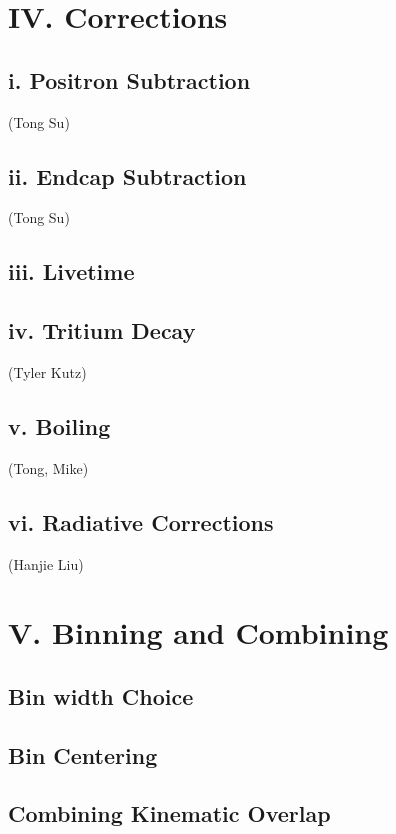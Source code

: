 \documentclass[letterpaper,aps,prl,superscriptaddress,floatfix,twocolumn]{revtex4}
\begin{document}
\section{IV. Corrections}

 \subsection{i. Positron Subtraction}
 (Tong Su)

 \subsection{ii. Endcap Subtraction}
 (Tong Su)

 \subsection{iii. Livetime}

 \subsection{iv. Tritium Decay}
 (Tyler Kutz)

 \subsection{v. Boiling}
 (Tong, Mike)

 \subsection{vi. Radiative Corrections}
 (Hanjie Liu)

\section{V. Binning and Combining}

 \subsection{Bin width Choice}

 \subsection{Bin Centering}

 \subsection{Combining Kinematic Overlap}
\end{document}
